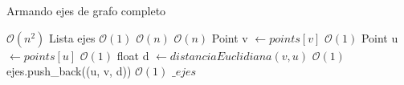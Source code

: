\begin{algorithm}[H]
\caption{Armando ejes de grafo completo}
\begin{algorithmic}[1]
 \Comment $\mathcal{O}(n^2)$
	\State Lista ejes \Comment $\mathcal{O}(1)$
	 \Comment $\mathcal{O}(n)$
	     \Comment $\mathcal{O}(n)$
            \State Point v $\gets points[v]$ \Comment $\mathcal{O}(1)$
            \State Point u $\gets points[u]$ \Comment $\mathcal{O}(1)$
            \State float d $\gets distanciaEuclidiana(v, u)$ \Comment $\mathcal{O}(1)$
            \State ejes.push_back((u, v, d)) \Comment $\mathcal{O}(1)$
		\EndFor
	\EndFor
    \State \Return $\_ejes$
\EndFunction
\end{algorithmic}
\end{algorithm}